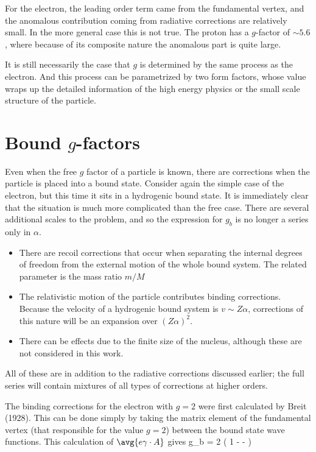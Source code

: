 For the electron, the leading order term came from the fundamental vertex, and the anomalous contribution coming from radiative corrections are relatively small.  In the more general case this is not true.  The proton has a $g$-factor of $\sim 5.6$, where because of its composite nature the anomalous part is quite large.

It is still necessarily the case that $g$ is determined by the same process as the electron.  And this process can be parametrized by two form factors, whose value wraps up the detailed information of the high energy physics or the small scale structure of the particle. 

\section{Bound $g$-factors}

Even when the free $g$ factor of a particle is known, there are corrections when the particle is placed into a bound state.  Consider again the simple case of the electron, but this time it sits in a hydrogenic bound state.  It is immediately clear that the situation is much more complicated than the free case.  There are several additional scales to the problem, and so the expression for $g_b$ is no longer a series only in $\alpha$.
\begin{itemize}
  \item 	There are recoil corrections that occur when separating the internal degrees of freedom from the external motion of the whole bound system.  The related parameter is the mass ratio $m/M$	%
  \item 	The relativistic motion of the particle contributes binding corrections.  Because the velocity of a hydrogenic bound system is $v \sim Z\alpha$, corrections of this nature will be an expansion over $(Z\alpha)^2$.
  \item		There can be effects due to the finite size of the nucleus, although these are not considered in this work.
\end{itemize}
All of these are in addition to the radiative corrections discussed earlier; the full series will contain mixtures of all types of corrections at higher orders.

The binding corrections for the electron with $g=2$ were first calculated by Breit (1928).  This can be done simply by taking the matrix element of the fundamental vertex (that responsible for the value $g=2$)  between the bound state wave functions.  This calculation of $\avg{ e\gamma \cdot A}$ gives
\beq 
	g_b = 2 \left( 1 -  -  \right )
\eeq



